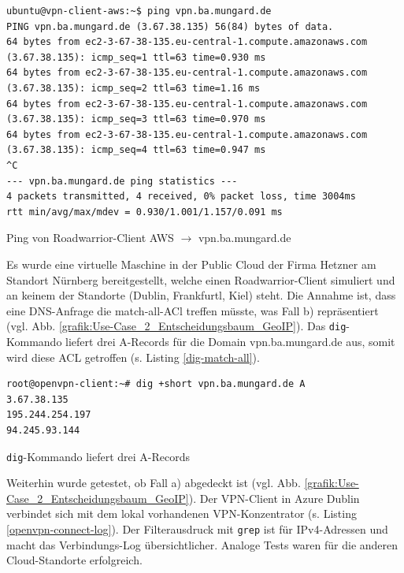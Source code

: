 \begin{listing}[h]
\begin{verbatim}
ubuntu@vpn-client-aws:~$ ping vpn.ba.mungard.de
PING vpn.ba.mungard.de (3.67.38.135) 56(84) bytes of data.
64 bytes from ec2-3-67-38-135.eu-central-1.compute.amazonaws.com (3.67.38.135): icmp_seq=1 ttl=63 time=0.930 ms
64 bytes from ec2-3-67-38-135.eu-central-1.compute.amazonaws.com (3.67.38.135): icmp_seq=2 ttl=63 time=1.16 ms
64 bytes from ec2-3-67-38-135.eu-central-1.compute.amazonaws.com (3.67.38.135): icmp_seq=3 ttl=63 time=0.970 ms
64 bytes from ec2-3-67-38-135.eu-central-1.compute.amazonaws.com (3.67.38.135): icmp_seq=4 ttl=63 time=0.947 ms
^C
--- vpn.ba.mungard.de ping statistics ---
4 packets transmitted, 4 received, 0% packet loss, time 3004ms
rtt min/avg/max/mdev = 0.930/1.001/1.157/0.091 ms

\end{verbatim}
\caption{Ping von Roadwarrior-Client AWS $\rightarrow$ vpn.ba.mungard.de}
\label{ping-aws-ip}
\end{listing}\FloatBarrier
Es wurde eine virtuelle Maschine in der Public Cloud der Firma Hetzner am Standort Nürnberg bereitgestellt, welche einen \gls{Roadwarrior}-\gls{Client} simuliert und an keinem der Standorte (Dublin, Frankfurtl, Kiel) steht. Die Annahme ist, dass eine \gls{DNS}-Anfrage die \glqq match-all\grqq-ACl treffen müsste, was Fall b) repräsentiert (vgl. Abb. \ref{grafik:Use-Case_2_Entscheidungsbaum_GeoIP}). Das \texttt{dig}-Kommando liefert drei A-Records für die Domain vpn.ba.mungard.de aus, somit wird diese \gls{ACL} getroffen (s. Listing \ref{dig-match-all}).
\begin{listing}[h]
\begin{verbatim}
root@openvpn-client:~# dig +short vpn.ba.mungard.de A
3.67.38.135
195.244.254.197
94.245.93.144

\end{verbatim}
\caption{\texttt{dig}-Kommando liefert drei A-Records}
\label{dig-match-all}
\end{listing}\FloatBarrier
\newpage
Weiterhin wurde getestet, ob Fall a) abgedeckt ist (vgl. Abb. \ref{grafik:Use-Case_2_Entscheidungsbaum_GeoIP}). Der VPN-\gls{Client} in Azure Dublin verbindet sich mit dem lokal vorhandenen \gls{VPN-Konzentrator} (s. Listing \ref{openvpn-connect-log}).
Der Filterausdruck mit \texttt{grep} ist für IPv4-Adressen und macht das Verbindungs-Log übersichtlicher. Analoge Tests waren für die anderen Cloud-Standorte erfolgreich.
